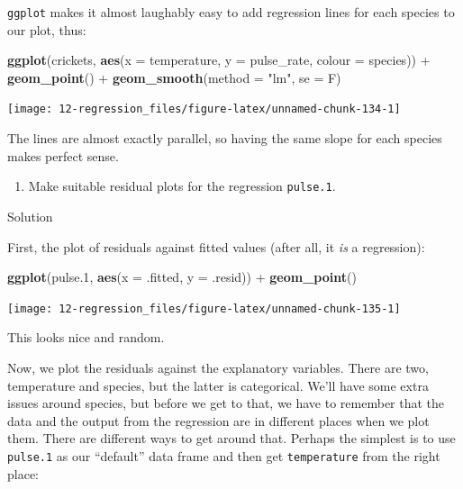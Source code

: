 \documentclass[]{tufte-book}
\newenvironment{Shaded}{}{}
\newcommand{\DataTypeTok}[1]{\textcolor[rgb]{0.56,0.13,0.00}{#1}}
\newcommand{\FloatTok}[1]{\textcolor[rgb]{0.25,0.63,0.44}{#1}}
\newcommand{\KeywordTok}[1]{\textcolor[rgb]{0.00,0.44,0.13}{\textbf{#1}}}
\newcommand{\NormalTok}[1]{#1}
\newcommand{\OperatorTok}[1]{\textcolor[rgb]{0.40,0.40,0.40}{#1}}
\newcommand{\StringTok}[1]{\textcolor[rgb]{0.25,0.44,0.63}{#1}}
\providecommand{\tightlist}{%
  \setlength{\itemsep}{0pt}\setlength{\parskip}{0pt}}
\theoremstyle{definition}
\theoremstyle{definition}
\theoremstyle{definition}
\theoremstyle{remark}
\begin{document}
\texttt{ggplot} makes it almost laughably easy to add regression lines
for each species to our plot, thus:

\begin{Shaded}
\begin{Highlighting}[]
\KeywordTok{ggplot}\NormalTok{(crickets, }\KeywordTok{aes}\NormalTok{(}\DataTypeTok{x =}\NormalTok{ temperature, }\DataTypeTok{y =}\NormalTok{ pulse_rate, }
    \DataTypeTok{colour =}\NormalTok{ species)) }\OperatorTok{+}\StringTok{ }\KeywordTok{geom_point}\NormalTok{() }\OperatorTok{+}\StringTok{ }\KeywordTok{geom_smooth}\NormalTok{(}\DataTypeTok{method =} \StringTok{"lm"}\NormalTok{, }
    \DataTypeTok{se =}\NormalTok{ F)}
\end{Highlighting}
\end{Shaded}

\texttt{[image: 12-regression\_files/figure-latex/unnamed-chunk-134-1]}

The lines are almost exactly parallel, so having the same slope for each
species makes perfect sense.

\begin{enumerate}
\def\labelenumi{(\alph{enumi})}
\setcounter{enumi}{6}
\tightlist
\item
  Make suitable residual plots for the regression \texttt{pulse.1}.
\end{enumerate}

Solution

First, the plot of residuals against fitted values (after all, it
\emph{is} a regression):

\begin{Shaded}
\begin{Highlighting}[]
\KeywordTok{ggplot}\NormalTok{(pulse}\FloatTok{.1}\NormalTok{, }\KeywordTok{aes}\NormalTok{(}\DataTypeTok{x =}\NormalTok{ .fitted, }\DataTypeTok{y =}\NormalTok{ .resid)) }\OperatorTok{+}\StringTok{ }
\StringTok{    }\KeywordTok{geom_point}\NormalTok{()}
\end{Highlighting}
\end{Shaded}

\texttt{[image: 12-regression\_files/figure-latex/unnamed-chunk-135-1]}

This looks nice and random.

Now, we plot the residuals against the explanatory variables. There are
two, temperature and species, but the latter is categorical. We'll have
some extra issues around species, but before we get to that, we have to
remember that the data and the output from the regression are in
different places when we plot them. There are different ways to get
around that. Perhaps the simplest is to use \texttt{pulse.1} as our
``default'' data frame and then get \texttt{temperature} from the right
place:
\end{document}
